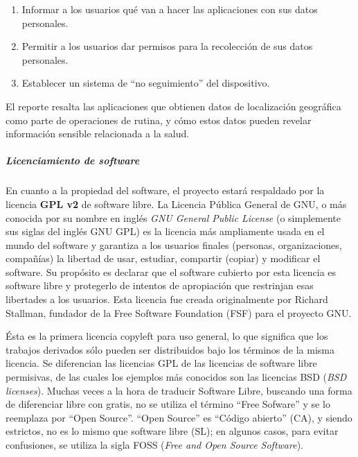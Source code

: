     \begin{enumerate}
		\item Informar a los usuarios qué van a hacer las aplicaciones con sus datos personales.
        \item Permitir a los usuarios dar permisos para la recolección de sus datos personales.
        \item Establecer un sistema de ``no seguimiento'' del dispositivo.
	\end{enumerate}
    
    El reporte resalta las aplicaciones que obtienen datos de localización geográfica como parte de operaciones de rutina, y cómo estos datos pueden revelar información sensible relacionada a la salud.
    \begin{comment}
        El tema de ingresar análisis clínicos por medio de imágenes!
	\end{comment}
    
    

\subparagraph{Licenciamiento de software}

    En cuanto a la propiedad del software, el proyecto estará respaldado por la licencia \textbf{GPL v2} de software libre.
    La Licencia Pública General de GNU, o más conocida por su nombre en inglés \textit{GNU General Public License} (o simplemente sus siglas del inglés GNU GPL) es la licencia más ampliamente usada en el mundo del software y garantiza a los usuarios finales (personas, organizaciones, compañías) la libertad de usar, estudiar, compartir (copiar) y modificar el software.
    Su propósito es declarar que el software cubierto por esta licencia es software libre y protegerlo de intentos de apropiación que restrinjan esas libertades a los usuarios.
    Esta licencia fue creada originalmente por Richard Stallman, fundador de la Free Software Foundation (FSF) para el proyecto GNU.
    
    Ésta es la primera licencia copyleft para uso general, lo que significa que los trabajos derivados sólo pueden ser distribuidos bajo los términos de la misma licencia.
     Se diferencian las licencias GPL de las licencias de software libre permisivas, de las cuales los ejemplos más conocidos son las licencias BSD (\textit{BSD licenses}).
     Muchas veces a la hora de traducir Software Libre, buscando una forma de diferenciar libre con gratis, no se utiliza el término ``Free Sofware'' y se lo reemplaza por ``Open Source''.
    ``Open Source'' es ``Código abierto'' (CA), y siendo estrictos, no es lo mismo que software libre (SL); en algunos casos, para evitar confusiones, se utiliza la sigla FOSS (\textit{Free and Open Source Software}).
    
